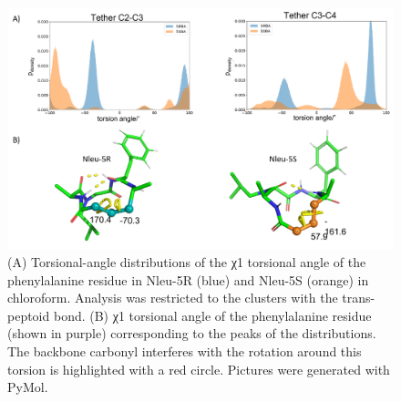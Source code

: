 \begin{figure}[h!]
    \centering
    \includegraphics[width=\textwidth]{7_chapter_5/fig/results/dihedral_dist.png}
    \caption{(A) Torsional-angle distributions of the χ1 torsional angle of the phenylalanine residue in Nleu-5R (blue) and Nleu-5S (orange) in chloroform. Analysis was restricted to the clusters with the trans-peptoid bond. (B) χ1 torsional angle of the phenylalanine residue (shown in purple) corresponding to the peaks of the distributions. The backbone carbonyl interferes with the rotation around this torsion is highlighted with a red circle. Pictures were generated with PyMol. \cite{Delano2020}}
    \label{fig: dihedralDistSubst}
\end{figure}

